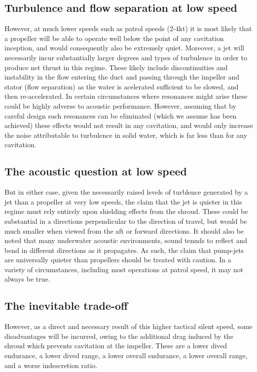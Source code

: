 \documentclass{article}\usepackage[]{graphicx}\usepackage[]{color}
\begin{document}
\subsection{Turbulence and flow separation at low speed}
However, at much lower speeds such as patrol speeds (2-4kt) it is most likely that a propeller will be able to operate well below the point of any cavitation inception, and would consequently also be extremely quiet.  Moreover, a jet will necessarily incur substantially larger degrees and types of turbulence in order to produce net thrust in this regime.  These likely include discontinuities and instability in the flow entering the duct and passing through the impeller and stator (flow separation) as the water is acelerated sufficient to be slowed, and then re-accelerated.  In certain circumstances where resonances might arise these could be highly adverse to acoustic performance.  However, assuming that by careful design such resonances can be eliminated (which we assume has been achieved) these effects would not result in any cavitation, and would only increase the noise attributable to turbulence in solid water, which is far less than for any cavitation.

\subsection{The acoustic question at low speed}
But in either case, given the necessarily raised levels of turblence generated by a jet than a propeller at very low speeds, the claim that the jet is quieter in this regime must rely entirely upon shielding effects from the shroud.  These could be substantial in a directions perpendicular to the direction of travel, but would be much smaller when viewed from the aft or forward directions.  It should also be noted that many underwater acoustic environments, sound tennds to reflect and bend in different directions as it propagates. As such, the claim that pump-jets are universally quieter than propellers should be treated with caution.  In a variety of circumstances, including most operations at patrol speed, it may not always be true.

\subsection{The inevitable trade-off}
However, as a direct and necessary result of this higher tactical silent speed, some disadvantages will be incurred, owing to the additional drag induced by the shroud which prevents cavitation at the impeller.  These are a lower dived endurance, a lower dived range, a lower overall endurance, a lower overall range, and a worse indescretion ratio.
\end{document}
